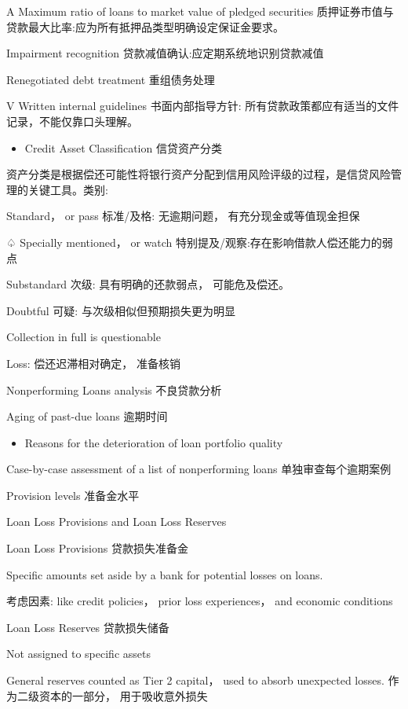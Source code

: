 A Maximum ratio of loans to market value of pledged securities 质押证券市值与贷款最大比率:应为所有抵押品类型明确设定保证金要求。

Impairment recognition 贷款减值确认:应定期系统地识别贷款减值

 Renegotiated debt treatment 重组债务处理

V Written internal guidelines 书面内部指导方针: 所有贷款政策都应有适当的文件记录，不能仅靠口头理解。

\begin{itemize}
\item Credit Asset Classification 信贷资产分类
\end{itemize}

 资产分类是根据偿还可能性将银行资产分配到信用风险评级的过程，是信贷风险管理的关键工具。类别:

 Standard， or pass 标准/及格: 无逾期问题， 有充分现金或等值现金担保

♤ Specially mentioned， or watch 特别提及/观察:存在影响借款人偿还能力的弱点

 Substandard 次级: 具有明确的还款弱点， 可能危及偿还。

 Doubtful 可疑: 与次级相似但预期损失更为明显

Collection in full is questionable

 Loss: 偿还迟滞相对确定， 准备核销

Nonperforming Loans analysis 不良贷款分析

 Aging of past-due loans 逾期时间

\begin{itemize}
\item Reasons for the deterioration of loan portfolio quality
\end{itemize}

Case-by-case assessment of a list of nonperforming loans 单独审查每个逾期案例

 Provision levels 准备金水平

Loan Loss Provisions and Loan Loss Reserves

Loan Loss Provisions 贷款损失准备金

Specific amounts set aside by a bank for potential losses on loans.

考虑因素: like credit policies， prior loss experiences， and economic conditions

Loan Loss Reserves 贷款损失储备

Not assigned to specific assets

General reserves counted as Tier 2 capital， used to absorb unexpected losses. 作为二级资本的一部分， 用于吸收意外损失

